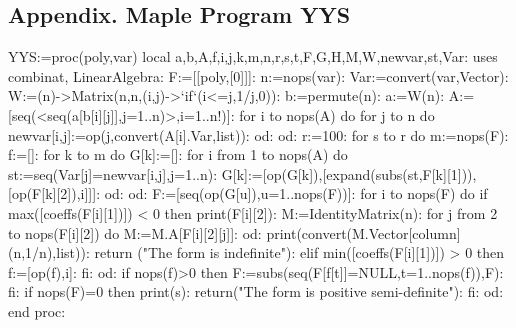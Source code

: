\documentclass [10pt,a4paper]{article}
\begin{document}
\subsection*{ Appendix.  Maple Program YYS}
\begin{maplettyout}
 YYS:=proc(poly,var)
 local a,b,A,f,i,j,k,m,n,r,s,t,F,G,H,M,W,newvar,st,Var:
 uses combinat, LinearAlgebra:
 F:=[[poly,[0]]]:
 n:=nops(var):
 Var:=convert(var,Vector):
 W:=(n)->Matrix(n,n,(i,j)->`if`(i<=j,1/j,0)):
 b:=permute(n): a:=W(n):
 A:=[seq(<seq(a[b[i][j]],j=1..n)>,i=1..n!)]:
 for i to nops(A) do
     for j to n do
         newvar[i,j]:=op(j,convert(A[i].Var,list)):
     od:
 od:
 r:=100:
 for s to r do
    m:=nops(F):
    f:=[]:
    for k to m do
        G[k]:=[]:
        for i from 1 to nops(A) do
            st:={seq(Var[j]=newvar[i,j],j=1..n)}:
            G[k]:=[op(G[k]),[expand(subs(st,F[k][1])),[op(F[k][2]),i]]]:
        od:
    od:
    F:=[seq(op(G[u]),u=1..nops(F))]:
    for i to nops(F) do
        if max([coeffs(F[i][1])]) < 0 then
            print(F[i][2]):
            M:=IdentityMatrix(n):
            for j from 2 to nops(F[i][2]) do
                M:=M.A[F[i][2][j]]:
            od:
            print(convert(M.Vector[column](n,1/n),list)):
            return ("The form is indefinite"):
       elif min([coeffs(F[i][1])]) > 0 then
            f:=[op(f),i]:
        fi:
    od:
    if nops(f)>0 then
        F:=subs({seq(F[f[t]]=NULL,t=1..nops(f))},F):
    fi:
    if nops(F)=0 then
        print(s):
        return("The form is positive semi-definite"):
    fi:
 od:
 end proc:

\end{maplettyout}



 \clearpage
\end{document}
